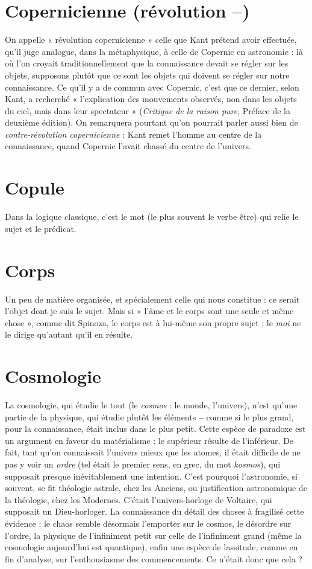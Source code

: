 \section{Copernicienne (révolution {\bf --})}
On appelle « révolution copernicienne » celle que Kant prétend
avoir effectuée, qu’il juge analogue, dans la métaphysique, à celle de Copernic
en astronomie : là où l’on croyait traditionnellement que la connaissance devait
se régler sur les objets, supposons plutôt que ce sont les objets qui doivent se
régler sur notre connaissance. Ce qu’il y a de commun avec Copernic, c’est que
ce dernier, selon Kant, a recherché « l'explication des mouvements observés,
non dans les objets du ciel, mais dans leur spectateur » ({\it Critique de la raison
pure}, Préface de la deuxième édition). On remarquera pourtant qu’on pourrait
parler aussi bien de {\it contre-révolution copernicienne} : Kant remet l’homme au
centre de la connaissance, quand Copernic l’avait chassé du centre de l’univers.

\section{Copule}
Dans la logique classique, c’est le mot (le plus souvent le verbe
être) qui relie le sujet et le prédicat.

\section{Corps}
Un peu de matière organisée, et spécialement celle qui nous
constitue : ce serait l’objet dont je suis le sujet. Mais si « l’âme et le
corps sont une seule et même chose », comme dit Spinoza, le corps est à lui-même
son propre sujet ; le {\it moi} ne le dirige qu’autant qu’il en résulte.

\section{Cosmologie}
La cosmologie, qui étudie le tout (le {\it cosmos} : le monde,
l'univers), n’est qu’une partie de la physique, qui étudie
plutôt les éléments {\bf --} comme si le plus grand, pour la connaissance, était inclus
dans le plus petit. Cette espèce de paradoxe est un argument en faveur du
matérialisme : le supérieur résulte de l’inférieur. De fait, tant qu’on connaissait
l'univers mieux que les atomes, il était difficile de ne pas y voir un {\it ordre} (tel
était le premier sens, en grec, du mot {\it kosmos}), qui supposait presque inévitablement
une intention. C’est pourquoi l’astronomie, si souvent, se fit théologie
astrale, chez les Anciens, ou justification astronomique de la théologie, chez les
Modernes. C’était l’univers-horloge de Voltaire, qui supposait un Dieu-horloger.
La connaissance du détail des choses à fragilisé cette évidence : le chaos
semble désormais l’emporter sur le cosmos, le désordre sur l’ordre, la physique
de l’infiniment petit sur celle de l’infiniment grand (même la cosmologie
aujourd’hui est quantique), enfin une espèce de lassitude, comme en fin d’analyse,
sur l’enthousiasme des commencements. Ce n’était donc que cela ?

